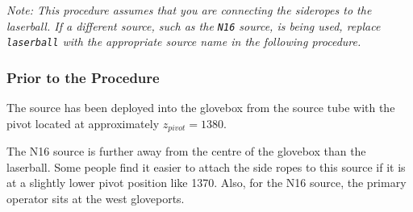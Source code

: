 \documentclass[11pt]{article}
\begin{document}
{\it Note: This procedure assumes that you are connecting the sideropes to the laserball. If a different source, such as the \verb+N16+ source, is being used, replace \verb+laserball+ with the appropriate source name in the following procedure.}

\subsubsection{Prior to the Procedure}
The source has been deployed into the glovebox from the source tube with the pivot located at approximately $z_{pivot} = 1380$.

The N16 source is further away from the centre of the glovebox than the laserball. Some people find it easier to attach the side ropes to this source if it is at a slightly lower pivot position like 1370. Also, for the N16 source, the primary operator sits at the west gloveports.
\end{document}
